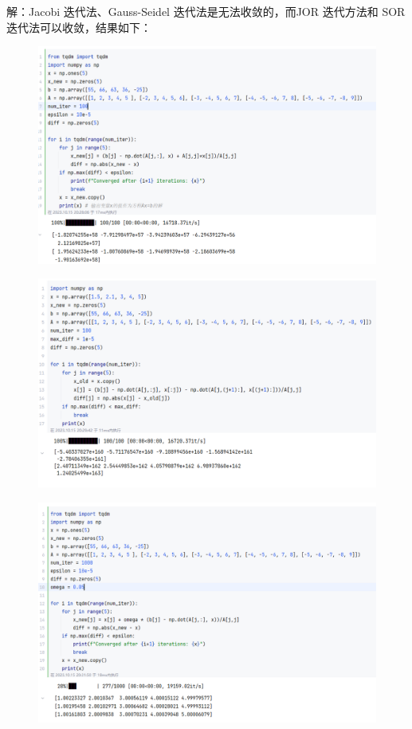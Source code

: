 \documentclass[a4paper,11pt,UTF8]{article}
\begin{document}
解：Jacobi 迭代法、Gauss-Seidel 迭代法是无法收敛的，而JOR 迭代方法和 SOR 迭代法可以收敛，结果如下：
\begin{figure}[H]
	\centering
	\includegraphics[scale=0.3]{3.10_1}
\end{figure}
\begin{figure}[H]
	\centering
	\includegraphics[scale=0.3]{3.10_2}
\end{figure}
\begin{figure}[H]
	\centering
	\includegraphics[scale=0.3]{3.10_3}
\end{figure}
\end{document}
